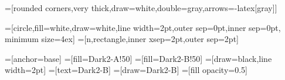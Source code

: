 \usepackage{xcolor}

\usepackage{tikz}
\usetikzlibrary{backgrounds}



=[rounded corners,very thick,draw=white,double=gray,arrows={-latex[gray]}]

=[circle,fill=white,draw=white,line width=2pt,outer sep=0pt,inner sep=0pt, minimum size=4ex]
=[n,rectangle,inner xsep=2pt,outer sep=2pt]

=[anchor=base]
=[fill=Dark2-A!50]
=[fill=Dark2-B!50]
=[draw=black,line width=2pt]
=[text=Dark2-B]
=[draw=Dark2-B]
=[fill opacity=0.5]

\newcommand\innode[ 2 ]{ 
  \begin{tikzpicture}[baseline] 
      \node[inline,inner ysep=0pt,inner xsep=3pt,outer sep=0pt,opacity=0] (n) {#1}; 
      \useasboundingbox (n.north west) rectangle (n.south east);
      \node[n,minimum size=3ex,inner sep=1pt,inline,#2] {#1}; 
  \end{tikzpicture}
  }

\makeatletter
\DeclareRobustCommand{\rvdots}{%
  \vbox{
    \baselineskip4\p@\lineskiplimit\z@
    \kern-\p@
    \hbox{.}\hbox{.}\hbox{.}
  }}
\makeatother